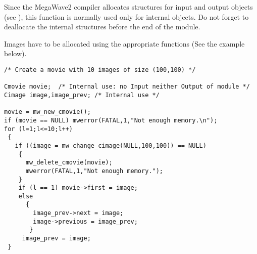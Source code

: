 Since the MegaWave2 compiler allocates structures for input and output 
objects (see \volI), this function is normally used only for internal objects.
Do not forget to deallocate the internal structures before the end
of the module.

Images have to be allocated using the appropriate functions (See the example
below).

\Next
\Example
\begin{verbatim}
/* Create a movie with 10 images of size (100,100) */

Cmovie movie;  /* Internal use: no Input neither Output of module */
Cimage image,image_prev; /* Internal use */

movie = mw_new_cmovie();
if (movie == NULL) mwerror(FATAL,1,"Not enough memory.\n");
for (l=1;l<=10;l++)
 {
   if ((image = mw_change_cimage(NULL,100,100)) == NULL)
    {
      mw_delete_cmovie(movie);
      mwerror(FATAL,1,"Not enough memory.");
    }
    if (l == 1) movie->first = image;
    else
      {
        image_prev->next = image;
        image->previous = image_prev;
       }
     image_prev = image;
 }
\end{verbatim}
\newpage %

